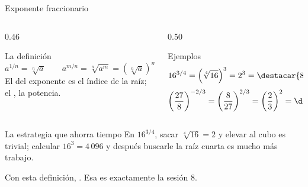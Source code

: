 \documentclass[aspectratio=169,10pt]{beamer}
\begin{document}
\begin{frame}{Exponente fraccionario}
  \scriptsize
  \begin{columns}[T,onlytextwidth]
    \begin{column}{0.46\textwidth}
      \begin{block}{La definición}
        \tiny
        \[ a^{1/n} = \sqrt[n]{a} \qquad
           a^{m/n} = \sqrt[n]{a^{m}} = \left(\sqrt[n]{a}\right)^{m} \]
        El  del exponente es el índice de la raíz; el
        , la potencia.
      \end{block}
    \end{column}
    \begin{column}{0.50\textwidth}
      \begin{exampleblock}{Ejemplos}
        \tiny
        \[ 16^{3/4} = \left(\sqrt[4]{16}\right)^{3} = 2^{3} = \destacar{8} \]
        \[ \left(\frac{27}{8}\right)^{-2/3}
           = \left(\frac{8}{27}\right)^{2/3}
           = \left(\frac{2}{3}\right)^{2} = \destacar{\frac{4}{9}} \]
      \end{exampleblock}
    \end{column}
  \end{columns}

  \vspace{0.1cm}
  \begin{alertblock}{La estrategia que ahorra tiempo}
    \scriptsize
     En $16^{3/4}$, sacar
    $\sqrt[4]{16}=2$ y elevar al cubo es trivial; calcular $16^3 = 4\,096$ y
    después buscarle la raíz cuarta es mucho más trabajo. 
  \end{alertblock}

  \vspace{0.05cm}
  {\tiny\color{uniGris} Con esta definición, . Esa es exactamente la sesión 8.}
\end{frame}
\end{document}
